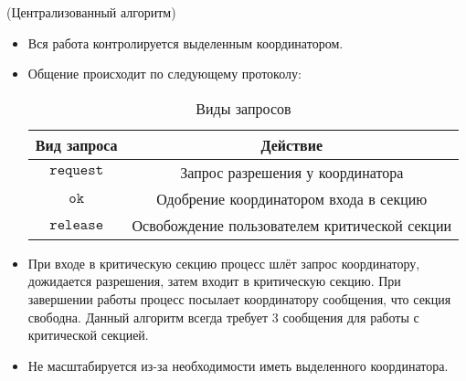 \begin{algorithm}(Централизованный алгоритм)
    \begin{itemize}
        \item Вся работа контролируется выделенным координатором.
        \item Общение происходит по следующему протоколу:
            \begin{table}[!ht]
                \centering
                \begin{tabular}{|c|c|} \hline
                    Вид запроса & Действие \\ \hline
                    $\texttt{request}$ & Запрос разрешения у координатора \\ \hline
                    $\texttt{ok}$ & Одобрение координатором входа в секцию \\ \hline
                    $\texttt{release}$ & Освобождение пользователем критической 
                    секции \\ \hline
                \end{tabular}
                \caption{Виды запросов}
            \end{table}
        \item При входе в критическую секцию процесс шлёт запрос координатору,
            дожидается разрешения, затем входит в критическую секцию.
            При завершении работы процесс посылает координатору сообщения,
            что секция свободна. Данный алгоритм всегда требует 3 сообщения для
            работы с критической секцией.
        \item Не масштабируется из-за необходимости иметь выделенного координатора.
    \end{itemize}
\end{algorithm}

